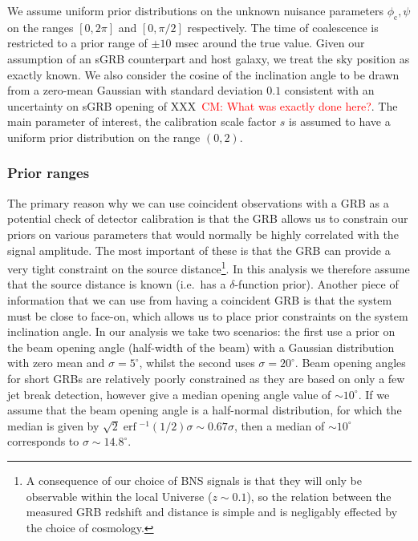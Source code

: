 \documentclass[10pt]{iopart}
\newcommand{\cm}[1]{\textcolor{red}{CM: #1}}
\DeclareMathOperator{\erf}{erf}
\begin{document}
We assume uniform prior distributions on the unknown nuisance parameters
$\phi_{\mathrm{c}},\psi$ on the ranges $[0, 2\pi]$ and $[0, \pi/2]$ respectively.
The time of coalescence is
restricted to a prior range of $\pm 10$ msec around the true value.  Given our
assumption of an \ac{sGRB} counterpart and host galaxy, we treat the sky
position as exactly known. We also consider the cosine of the inclination angle to be drawn
from a zero-mean Gaussian with standard deviation $0.1$ consistent with an
uncertainty on \ac{sGRB} opening of XXX~\cm{What was exactly done here?}.  The
main parameter of interest, the calibration scale factor $s$ is assumed to have
a uniform prior distribution on the range $(0,2)$.    

\subsubsection{Prior ranges}\label{sec:priors}

The primary reason why we can use coincident observations with a GRB as a potential check of 
detector calibration is that the GRB allows us to constrain our priors on various parameters that 
would normally be highly correlated with the signal amplitude. The most important of these is that 
the GRB can provide a very tight constraint on the source distance\footnote{A consequence of our 
choice of BNS signals is that they will only be observable within the local Universe ($z \sim 
0.1$), so the relation between the measured GRB redshift and distance is simple and is negligably 
effected by the choice of cosmology.}. In this analysis we therefore assume that the source distance 
is known (i.e.\ has a $\delta$-function prior). Another piece of information that we can use from 
having a coincident GRB is that the system must be close to face-on, which allows us to place prior 
constraints on the system inclination angle. In our analysis we take two scenarios: the first use a 
prior on the beam opening angle (half-width of the beam) with a Gaussian distribution with zero mean 
and $\sigma = 5^{\circ}$, whilst the second uses $\sigma = 20^{\circ}$. Beam opening angles for 
short GRBs are relatively poorly constrained as they are based on only a few jet break detection, 
however \cite{2014ApJ...780..118F} give a median opening angle value of $\sim 10^{\circ}$. If we 
assume that the beam opening angle is a half-normal distribution, for which the median is given by 
$\sqrt{2}\erf{}^{-1}(1/2)\sigma \sim 0.67\sigma$, then a median of $\sim 10^{\circ}$ corresponds to 
$\sigma \sim 14.8^{\circ}$.
\end{document}
